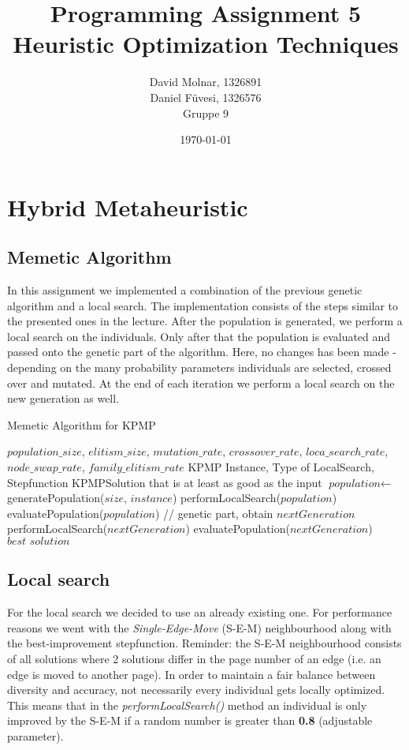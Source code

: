 \documentclass[11pt]{article}
\title{Programming Assignment 5\\ \vspace{10px} \large Heuristic Optimization Techniques}
\author{David Molnar, 1326891\\ Daniel Füvesi, 1326576\\Gruppe 9}
\date{\today}
\begin{document}
\lstset{language=Java}
\maketitle
 
\section{Hybrid Metaheuristic}
\subsection{Memetic Algorithm}
\hspace{0.5cm}In this assignment we implemented a combination of the previous genetic algorithm and a local search. The implementation consists of the steps similar to the presented ones in the lecture. After the population is generated, we perform a local search on the individuals. Only after that the population is evaluated and passed onto the genetic part of the algorithm. Here, no changes has been made - depending on the many probability parameters individuals are selected, crossed over and mutated. At the end of each iteration we perform a local search on the new generation as well.
\begin{algorithm}
	\caption{Memetic Algorithm for KPMP}\label{euclid}
	\begin{algorithmic}[1]
		\Variables
		\State $population\_size$, $elitism\_size$, $mutation\_rate$, $crossover\_rate$, $loca\_search\_rate$, $node\_swap\_rate$, $family\_elitism\_rate$
		\EndVariables
		\Require KPMP Instance, Type of LocalSearch, Stepfunction
		\Ensure KPMPSolution that is at least as good as the input
		\State $\textit{population} \gets $generatePopulation($size$, $instance$)
		\State performLocalSearch($population$)
		\State evaluatePopulation($population$)
		\State // genetic part, obtain $nextGeneration$
		\State performLocalSearch($nextGeneration$)
		\State evaluatePopulation($nextGeneration$)
		\EndWhile
		\Return $\textit{best solution}$
		\EndFunction
		
	\end{algorithmic}
\end{algorithm}
\subsection{Local search}
\hspace{0.5cm}For the local search we decided to use an already existing one. For performance reasons we went with the \textit{Single-Edge-Move} (S-E-M) neighbourhood along with the best-improvement stepfunction. Reminder: the S-E-M neighbourhood consists of all solutions where 2 solutions differ in the page number of an edge (i.e. an edge is moved to another page). In order to maintain a fair balance between diversity and accuracy, not necessarily every individual gets locally optimized. This means that in the \textit{performLocalSearch()} method an individual is only improved by the S-E-M if a random number is greater than \textbf{0.8} (adjustable parameter). 
\end{document}
